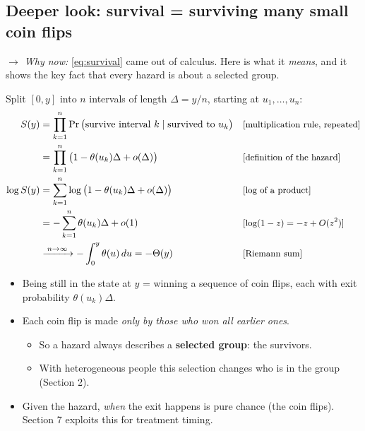 \documentclass[11pt]{article}
\newcommand{\1}{\mathbf{1}}
\newcommand{\why}[1]{\text{\small[#1]}}
\newcommand{\whynow}[1]{\par\noindent\textit{$\rightarrow$ Why now:} #1\par}
\begin{document}
\subsection{Deeper look: survival = surviving many small coin flips}
\whynow{\eqref{eq:survival} came out of calculus. Here is what it \emph{means}, and it shows the key fact that every hazard is about a selected group.}

Split $[0,y]$ into $n$ intervals of length $\Delta=y/n$, starting at $u_1,\dots,u_n$:
\begin{align}
  S(y) &= \prod_{k=1}^n \Pr\big(\text{survive interval }k \mid \text{survived to }u_k\big) && \why{multiplication rule, repeated} \nonumber\\
  &= \prod_{k=1}^n \big(1-\theta(u_k)\Delta+o(\Delta)\big) && \why{definition of the hazard} \nonumber\\
  \log S(y) &= \sum_{k=1}^n \log\big(1-\theta(u_k)\Delta+o(\Delta)\big) && \why{log of a product} \nonumber\\
  &= -\sum_{k=1}^n \theta(u_k)\Delta + o(1) && \why{$\log(1-z)=-z+O(z^2)$} \nonumber\\
  &\xrightarrow{\;n\to\infty\;} -\int_0^y\theta(u)\,du = -\Theta(y) && \why{Riemann sum} \nonumber
\end{align}
\begin{itemize}
  \item Being still in the state at $y$ = winning a sequence of coin flips, each with exit probability $\theta(u_k)\Delta$.
  \item Each coin flip is made \emph{only by those who won all earlier ones}.
    \begin{itemize}
      \item So a hazard always describes a \textbf{selected group}: the survivors.
      \item With heterogeneous people this selection changes who is in the group (Section 2).
    \end{itemize}
  \item Given the hazard, \emph{when} the exit happens is pure chance (the coin flips). Section 7 exploits this for treatment timing.
\end{itemize}
\end{document}
